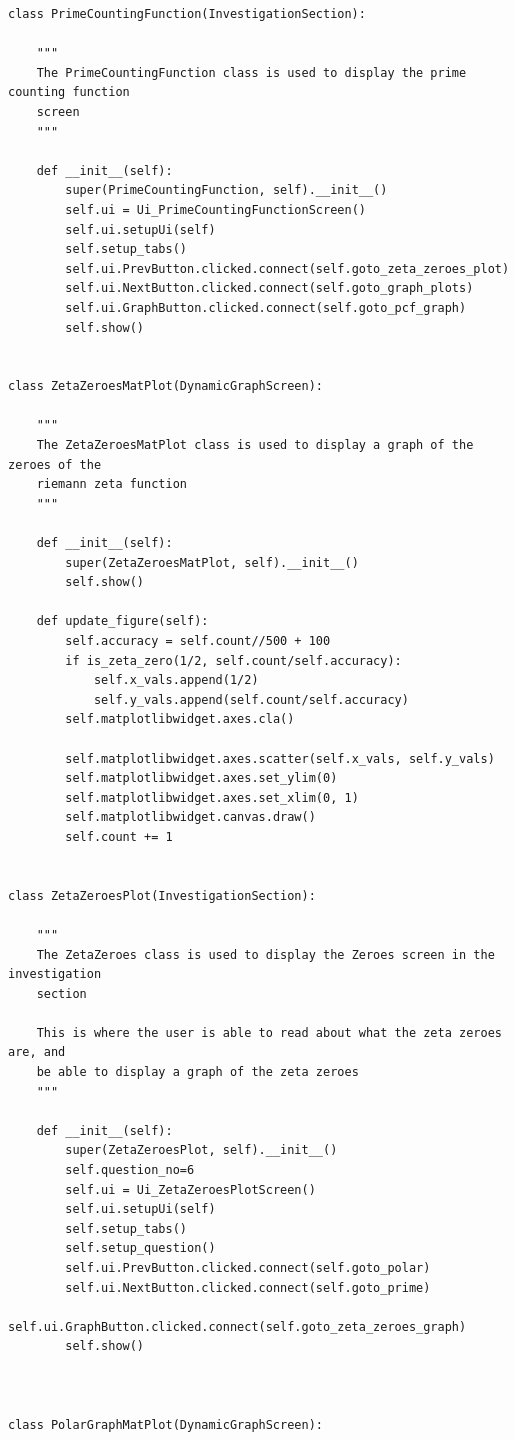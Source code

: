 \documentclass[12pt]{article}
\begin{document}
\begin{lstlisting}
class PrimeCountingFunction(InvestigationSection):

    """
    The PrimeCountingFunction class is used to display the prime counting function
    screen
    """

    def __init__(self):
        super(PrimeCountingFunction, self).__init__()
        self.ui = Ui_PrimeCountingFunctionScreen()
        self.ui.setupUi(self)
        self.setup_tabs()
        self.ui.PrevButton.clicked.connect(self.goto_zeta_zeroes_plot)
        self.ui.NextButton.clicked.connect(self.goto_graph_plots)
        self.ui.GraphButton.clicked.connect(self.goto_pcf_graph)
        self.show()


class ZetaZeroesMatPlot(DynamicGraphScreen):

    """
    The ZetaZeroesMatPlot class is used to display a graph of the zeroes of the
    riemann zeta function
    """

    def __init__(self):
        super(ZetaZeroesMatPlot, self).__init__()
        self.show()

    def update_figure(self):
        self.accuracy = self.count//500 + 100
        if is_zeta_zero(1/2, self.count/self.accuracy):
            self.x_vals.append(1/2)
            self.y_vals.append(self.count/self.accuracy)
        self.matplotlibwidget.axes.cla()

        self.matplotlibwidget.axes.scatter(self.x_vals, self.y_vals)
        self.matplotlibwidget.axes.set_ylim(0)
        self.matplotlibwidget.axes.set_xlim(0, 1)
        self.matplotlibwidget.canvas.draw()
        self.count += 1


class ZetaZeroesPlot(InvestigationSection):

    """
    The ZetaZeroes class is used to display the Zeroes screen in the investigation
    section

    This is where the user is able to read about what the zeta zeroes are, and
    be able to display a graph of the zeta zeroes
    """

    def __init__(self):
        super(ZetaZeroesPlot, self).__init__()
        self.question_no=6
        self.ui = Ui_ZetaZeroesPlotScreen()
        self.ui.setupUi(self)
        self.setup_tabs()
        self.setup_question()
        self.ui.PrevButton.clicked.connect(self.goto_polar)
        self.ui.NextButton.clicked.connect(self.goto_prime)
        self.ui.GraphButton.clicked.connect(self.goto_zeta_zeroes_graph)
        self.show()



class PolarGraphMatPlot(DynamicGraphScreen):


\end{lstlisting}
\end{document}

